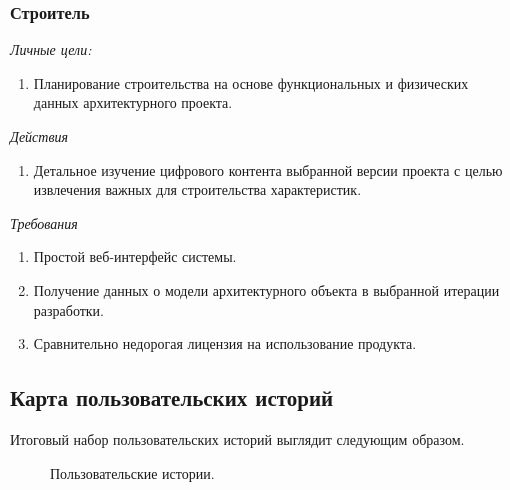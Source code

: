 \documentclass[a4paper,14pt]{extreport} %
\begin{document}
\subsubsection{Строитель}

\textit{Личные цели:}
\begin{enumerate}
\item Планирование строительства на основе функциональных и физических данных архитектурного проекта.
\end{enumerate}
\textit{Действия}
\begin{enumerate}
\item Детальное изучение цифрового контента выбранной версии проекта с целью извлечения важных для строительства характеристик.
\end{enumerate}
\textit{Требования}
\begin{enumerate}
\item Простой веб-интерфейс системы.
\item Получение данных о модели архитектурного объекта в выбранной итерации разработки.
\item Сравнительно недорогая лицензия на использование продукта.
\end{enumerate}

\newpage
\subsection{Карта пользовательских историй}

Итоговый набор пользовательских историй выглядит следующим образом.

\begin{figure}[H]
\caption{Пользовательские истории.}
\label{user-stories}
\end{figure}
\end{document}
